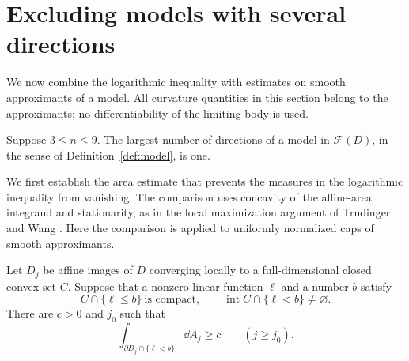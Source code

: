 \section{Excluding models with several directions}\label{sec:bounds}

We now combine the logarithmic inequality with estimates on smooth
approximants of a model.  All curvature quantities in this section belong
to the approximants; no differentiability of the limiting body is used.

\begin{proposition}\label{prop:one-direction}
Suppose \(3\le n\le9\).  The largest number of directions of a model in
\(\mathcal F(D)\), in the sense of Definition~\ref{def:model}, is one.
\end{proposition}

We first establish the area estimate that prevents the measures in the
logarithmic inequality from vanishing. The comparison uses concavity
of the affine-area integrand and stationarity, as in the local
maximization argument of Trudinger and Wang
\cite[Section~6, Equations~(6.2)--(6.4)]{TW2000}. Here the comparison
is applied to uniformly normalized caps of smooth approximants.

\begin{lemma}\label{lem:positive-cap-area}
Let \(D_j\) be affine images of \(D\) converging locally to a
full-dimensional closed convex set \(C\).  Suppose that a nonzero linear
function \(\ell\) and a number \(b\) satisfy
\[
 C\cap\{\ell\le b\}\ \text{is compact},
 \qquad
 \operatorname{int}C\cap\{\ell<b\}\ne\varnothing.
\]
There are \(c>0\) and \(j_0\) such that
\[
 \int_{\partial D_j\cap\{\ell<b\}}\dd A_j\ge c
 \qquad(j\ge j_0).
\]
\end{lemma}

